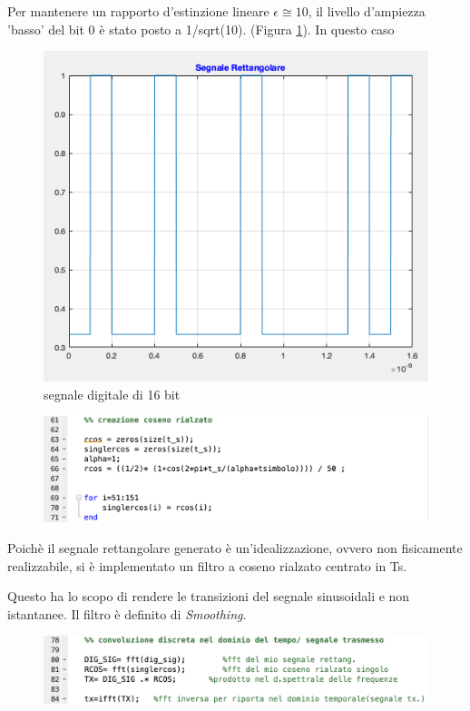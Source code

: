 \documentclass[12pt, a4paper]{article}
\begin{document}
Per mantenere un rapporto d'estinzione lineare $\epsilon \cong 10$, il livello d'ampiezza 'basso' del bit 0 è stato posto a 1/sqrt(10). (Figura \ref{dig_sig}).
In questo caso
  \begin{figure}[h!]
  \centering
  \includegraphics[scale = 0.6]{digsig.png}
  \caption{segnale digitale di 16 bit}
  \label{dig_sig}
  \end{figure}


\newpage
\begin{figure}[h!]
\centering
\includegraphics[scale=0.4]{cosenorialzato.png}
\caption{}
\label{6}
\end{figure}

Poichè il segnale rettangolare generato è un'idealizzazione, ovvero non fisicamente realizzabile, si è implementato un filtro a coseno rialzato centrato in Ts.

Questo ha lo scopo di rendere le transizioni del segnale sinusoidali e non istantanee. 
Il filtro è definito di \textit{Smoothing}.

\begin{figure}[h!]
\centering
\includegraphics[scale=0.4]{convoluzionediscreta.png}
\caption{}
\label{}
\end{figure}
\end{document}
